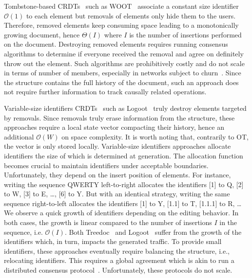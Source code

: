 Tombstone-based CRDTs~\cite{ahmed2011evaluating, conway2014language,
  grishchenko2010deep, oster2006data, roh2011replicated, weiss2007wooki,
  wu2010partial, yu2012stringwise} such as WOOT~\cite{oster2006data} associate a
constant size identifier $\mathcal{O}(1)$ to each element but removals of
elements only hide them to the users. Therefore, removed elements keep consuming
space leading to a monotonically growing document, hence $\Theta(I)$ where $I$
is the number of insertions performed on the document.  Destroying removed
elements requires running consensus algorithms to determine if everyone received
the removal and agree on definitely throw out the element. Such algorithms are
prohibitively costly and do not scale in terms of number of members, especially
in networks subject to churn~\cite{mostefaoui2015signature}. Since the structure
contains the full history of the document, such an approach does not require
further information to track causally related operations.

Variable-size identifiers CRDTs~\cite{nedelec2013lseq, preguica2009commutative,
  weiss2009logoot} such as Logoot~\cite{weiss2009logoot} truly destroy elements
targeted by removals.  Since removals truly erase information from the
structure, these approaches require a local state vector compacting their
history, hence an additional $\mathcal{O}(W)$ on space complexity. It is worth
noting that, contrarily to OT, the vector is only stored locally. Variable-size
identifiers approaches allocate identifiers the size of which is determined at
generation. The allocation function becomes crucial to maintain identifiers
under acceptable boundaries. Unfortunately, they depend on the insert position
of elements. For instance, writing the sequence QWERTY left-to-right allocates
the identifiers [1] to Q, [2] to W, [3] to E, \ldots, [6] to Y. But with an
identical strategy, writing the same sequence right-to-left allocates the
identifiers [1] to Y, [1.1] to T, [1.1.1] to R, \ldots We observe a quick growth
of identifiers depending on the editing behavior. In both cases, the growth is
linear compared to the number of insertions $I$ in the sequence,
i.e. $\mathcal{O}(I)$. Both Treedoc~\cite{preguica2009commutative} and
Logoot~\cite{weiss2009logoot, weiss2010logootundo} suffer from the growth of the
identifiers which, in turn, impacts the generated traffic.
To provide small identifiers, these approaches eventually require balancing the
structure, i.e., relocating identifiers. This requires a global agreement which is
akin to run a distributed consensus
protocol~\cite{zawirski2011asynchronous}. Unfortunately, these protocols do not
scale.

